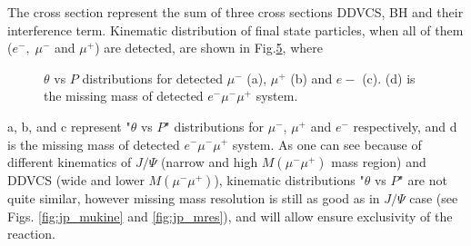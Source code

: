 The cross section represent the sum of three cross sections DDVCS, BH and their interference term.
Kinematic distribution of final state particles, when all of them ($e^{-},\;\mu^{-}$ and $\mu^{+}$) are detected, are shown in 
Fig.\ref{fig:particle_kinematic_distr}, where
\begin{figure}[!htb]
 \centering
  \begin{subfigure}{0.48 \tw}
  \caption{}
  \label{fig:th_P_mum_rec4}
 \end{subfigure}
 \begin{subfigure}{0.48 \tw}
  \caption{}
  \label{fig:th_P_mup_rec4}
 \end{subfigure}
 \begin{subfigure}{0.48 \tw}
  \caption{}
  \label{fig:th_P_em_rec2}
 \end{subfigure}
 \begin{subfigure}{0.48 \tw}
  \caption{}
  \label{fig:MM_smear1}
 \end{subfigure}
 \caption{ $\theta$ vs $P$ distributions for detected $\mu^{-}$ (a), $\mu^{+}$ (b) and $e-$ (c).
(d) is the missing mass of detected $e^{-}\mu^{-}\mu^{+}$ system.}
\label{fig:particle_kinematic_distr}
\end{figure}
a, b, and c represent "$\theta$ vs $P$" distributions for $\mu^{-}$, $\mu^{+}$ and $e^{-}$ respectively, and d is the
missing mass of detected $e^{-}\mu^{-}\mu^{+}$ system.
As one can see because of different kinematics of $J/\Psi$ (narrow and high $M(\mu^{-}\mu^{+})$ mass region) and DDVCS (wide and lower $M(\mu^{-}\mu^{+})$),
kinematic distributions "$\theta$ vs $P$" are not quite similar,
however missing mass resolution is still as good as in $J/\Psi$
case (see Figs. \ref{fig:jp_mukine} and \ref{fig:jp_mres}), and will allow ensure exclusivity of the reaction.

